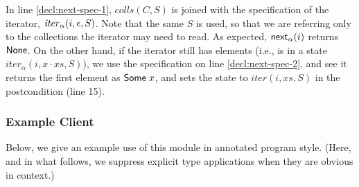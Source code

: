 In line \ref{decl:next-spec-1}, $\mathit{colls}(C, S)$ is joined with 
the specification of the iterator, $\mathit{iter}_\alpha(i, \epsilon, S)$. Note
that the same $S$ is used, so that we are referring only to the collections
the iterator may need to read.  As expected, $\mathsf{next}_\alpha(i)$ returns 
$\mathsf{None}$.  On the other hand, if the iterator still has elements (i.e., is in a state
$iter_\alpha(i, x\cdot xs, S)$), we use the specification on line \ref{decl:next-spec-2}, 
and see it returns the first element as
$\mathsf{Some}\;x$, and sets the state to $iter(i, xs, S)$ in the
postcondition (line 15). 

\subsubsection{Example Client}

Below, we give an example use of this module in annotated program
style. (Here, and in what follows, we suppress explicit type
applications when they are obvious in context.)

